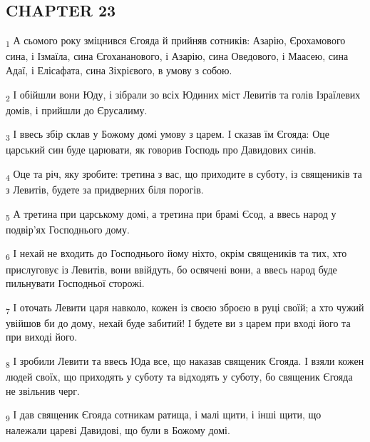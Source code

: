 \subsection{CHAPTER 23}
\begin{tcolorbox}
\textsubscript{1} А сьомого року зміцнився Єгояда й прийняв сотників: Азарію, Єрохамового сина, і Ізмаїла, сина Єгохананового, і Азарію, сина Оведового, і Маасею, сина Адаї, і Елісафата, сина Зіхрієвого, в умову з собою.
\end{tcolorbox}
\begin{tcolorbox}
\textsubscript{2} І обійшли вони Юду, і зібрали зо всіх Юдиних міст Левитів та голів Ізраїлевих домів, і прийшли до Єрусалиму.
\end{tcolorbox}
\begin{tcolorbox}
\textsubscript{3} І ввесь збір склав у Божому домі умову з царем. І сказав їм Єгояда: Оце царський син буде царювати, як говорив Господь про Давидових синів.
\end{tcolorbox}
\begin{tcolorbox}
\textsubscript{4} Оце та річ, яку зробите: третина з вас, що приходите в суботу, із священиків та з Левитів, будете за придверних біля порогів.
\end{tcolorbox}
\begin{tcolorbox}
\textsubscript{5} А третина при царському домі, а третина при брамі Єсод, а ввесь народ у подвір'ях Господнього дому.
\end{tcolorbox}
\begin{tcolorbox}
\textsubscript{6} І нехай не входить до Господнього йому ніхто, окрім священиків та тих, хто прислуговує із Левитів, вони ввійдуть, бо освячені вони, а ввесь народ буде пильнувати Господньої сторожі.
\end{tcolorbox}
\begin{tcolorbox}
\textsubscript{7} І оточать Левити царя навколо, кожен із своєю зброєю в руці своїй; а хто чужий увійшов би до дому, нехай буде забитий! І будете ви з царем при вході його та при виході його.
\end{tcolorbox}
\begin{tcolorbox}
\textsubscript{8} І зробили Левити та ввесь Юда все, що наказав священик Єгояда. І взяли кожен людей своїх, що приходять у суботу та відходять у суботу, бо священик Єгояда не звільнив черг.
\end{tcolorbox}
\begin{tcolorbox}
\textsubscript{9} І дав священик Єгояда сотникам ратища, і малі щити, і інші щити, що належали цареві Давидові, що були в Божому домі.
\end{tcolorbox}
